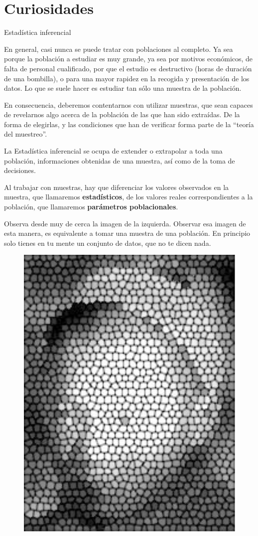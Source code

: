 
\section{Curiosidades}
\begin{myexampleblock}{Estadística inferencial}

\vspace{2mm} En general, casi nunca se puede tratar con poblaciones al completo. Ya sea porque la población a estudiar es muy grande, ya sea por motivos económicos, de falta de personal cualificado, por que el estudio es destructivo (horas de duración de una bombilla), o para una mayor rapidez en la recogida y presentación de los datos. Lo que se suele hacer es estudiar tan sólo una muestra de la población. 

\vspace{2mm} En consecuencia, deberemos contentarnos con utilizar muestras, que sean capaces de revelarnos algo acerca de la población de las que han sido extraídas. De la forma de elegirlas, y las condiciones que han de verificar forma parte de la ``teoría del muestreo''.

\vspace{2mm} La Estadística inferencial se ocupa de extender o extrapolar a toda una población, informaciones obtenidas de una muestra, así como de la toma de decisiones. 

\vspace{2mm} Al trabajar con muestras, hay que diferenciar los valores observados en la muestra, que llamaremos \textbf{estadísticos}, de los valores reales correspondientes a la población, que llamaremos \textbf{parámetros poblacionales}. 

\vspace{2mm} Observa desde muy de cerca la imagen de la izquierda. Observar esa imagen de esta manera, es equivalente a tomar una muestra de una población. En principio solo tienes en tu mente un conjunto de datos, que no te dicen nada. 

\begin{multicols}{2}
\begin{figure}[H]
	\centering
	\includegraphics[width=.3\textwidth]{imagenes/imagenes05/T05IM05.png}
	\end{figure}
	

\end{multicols}
\end{myexampleblock}

